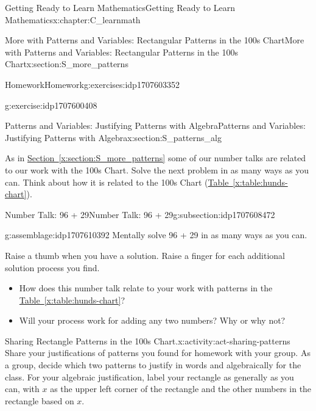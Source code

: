 \documentclass[oneside,10pt,]{book}
\newcommand{\xreffont}{\relax}
\numberwithin{equation}{chapter}
\begin{document}
\begin{chapterptx}{Getting Ready to Learn Mathematics}{}{Getting Ready to Learn Mathematics}{}{}{x:chapter:C_learnmath}
\begin{sectionptx}{More with Patterns and Variables: Rectangular Patterns in the 100s Chart}{}{More with Patterns and Variables: Rectangular Patterns in the 100s Chart}{}{}{x:section:S_more_patterns}
\begin{exercises-subsection}{Homework}{}{Homework}{}{}{g:exercises:idp1707603352}
\begin{divisionexercise}{3}{}{}{g:exercise:idp1707600408}
\end{divisionexercise}%
\end{exercises-subsection}
\end{sectionptx}
%
%
\typeout{************************************************}
\typeout{************************************************}
%
\begin{sectionptx}{Patterns and Variables: Justifying Patterns with Algebra}{}{Patterns and Variables: Justifying Patterns with Algebra}{}{}{x:section:S_patterns_alg}
\begin{introduction}{}%
As in \hyperref[x:section:S_more_patterns]{Section~{\xreffont\ref{x:section:S_more_patterns}}} some of our number talks are related to our work with the 100s Chart. Solve the next problem in as many ways as you can. Think about how it is related to the 100s Chart (\hyperref[x:table:hunds-chart]{Table~{\xreffont\ref{x:table:hunds-chart}}}).%
\end{introduction}%
%
%
\typeout{************************************************}
\typeout{************************************************}
%
\begin{subsectionptx}{Number Talk: 96 + 29}{}{Number Talk: 96 + 29}{}{}{g:subsection:idp1707608472}
\begin{assemblage}{}{g:assemblage:idp1707610392}%
Mentally solve 96 + 29 in as many ways as you can.%
\par
Raise a thumb when you have a solution. Raise a finger for each additional solution process you find.%
\end{assemblage}
%
\begin{itemize}[label=\textbullet]
\item{}How does this number talk relate to your work with patterns in the \hyperref[x:table:hunds-chart]{Table~{\xreffont\ref{x:table:hunds-chart}}}?%
\item{}Will your process work for adding any two numbers? Why or why not?%
\end{itemize}
\end{subsectionptx}
\begin{activity}{Sharing Rectangle Patterns in the 100s Chart.}{x:activity:act-sharing-patterns}%
Share your justifications of patterns you found for homework with your group. As a group, decide which two patterns to justify in words and algebraically for the class. For your algebraic justification, label your rectangle as generally as you can, with \(x\) as the upper left corner of the rectangle and the other numbers in the rectangle based on \(x\).%

\end{activity}
\end{sectionptx}
\end{chapterptx}
\end{document}
